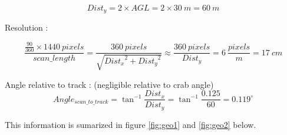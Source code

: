 \documentclass[a4paper,11pt]{report}
\begin{document}
\begin{equation} 
Dist_{y}=  2 \times AGL = 2 \times 30~m = 60~m
\end{equation}

Resolution :

\begin{equation}  
\frac{ \frac{90}{360} \times 1440~pixels }{scan\_length} = 
\frac{360~pixels}{\sqrt{{Dist_x}^2+{Dist_y}^2}} \approx \frac{360~pixels}{Dist_y}= 6~ \frac{pixels}{m} = 17~cm
\end{equation}

Angle relative to track : (negligible relative to crab angle)
\begin{equation} Angle_{scan\_to\_track} = \tan^{-1} \frac{Dist_x}{Dist_y} = \tan^{-1} \frac{0.125}{60} = 0.119^\circ
\end{equation}

This information is sumarized in figure \ref{fig:geo1} and \ref{fig:geo2} below.
\end{document}
